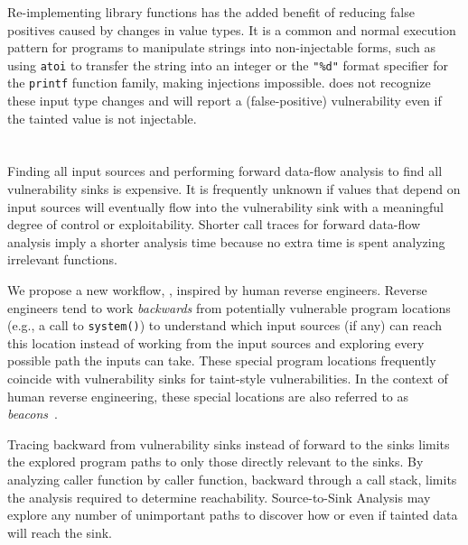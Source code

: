 Re-implementing library functions has the added benefit of reducing false positives caused by changes in value types.
It is a common and normal execution pattern for programs to manipulate strings into non-injectable forms, such as using \texttt{atoi} to transfer the string into an integer or the \texttt{"\%d"} format specifier for the \texttt{printf} function family, making injections impossible.
\satc does not recognize these input type changes and will report a (false-positive) vulnerability even if the tainted value is not injectable.


\section{\rev}
\label{sec:rev}



Finding all input sources and performing forward data-flow analysis to find all vulnerability sinks is expensive.
It is frequently unknown if values that depend on input sources will eventually flow into the vulnerability sink with a meaningful degree of control or exploitability.
Shorter call traces for forward data-flow analysis imply a shorter analysis time because no extra time is spent analyzing irrelevant functions.

We propose a new workflow, \rev, inspired by human reverse engineers.
Reverse engineers tend to work \emph{backwards} from potentially vulnerable program locations (e.g., a call to \texttt{system()}) to understand which input sources (if any) can reach this location instead of working from the input sources and exploring every possible path the inputs can take.
These special program locations frequently coincide with vulnerability sinks for taint-style vulnerabilities.
In the context of human reverse engineering, these special locations are also referred to as \emph{beacons}~\cite{votipka2019observational}.

Tracing backward from vulnerability sinks instead of forward to the sinks limits the explored program paths to only those directly relevant to the sinks.
By analyzing caller function by caller function, backward through a call stack, \rev limits the analysis required to determine reachability.
Source-to-Sink Analysis may explore any number of unimportant paths to discover how or even if tainted data will reach the sink.

